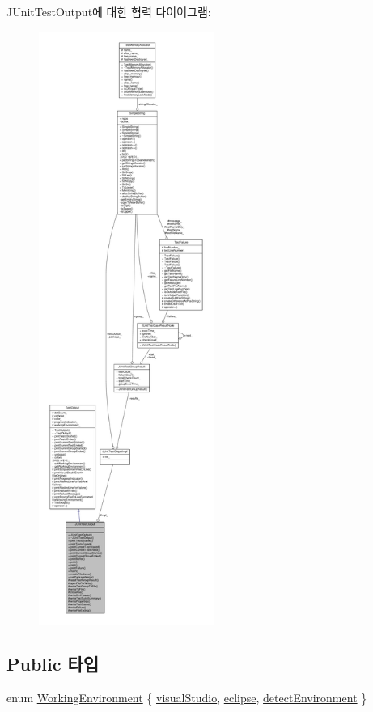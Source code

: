 J\+Unit\+Test\+Output에 대한 협력 다이어그램\+:
\nopagebreak
\begin{figure}[H]
\begin{center}
\leavevmode
\includegraphics[height=550pt]{class_j_unit_test_output__coll__graph}
\end{center}
\end{figure}
\subsection*{Public 타입}
\begin{DoxyCompactItemize}
\item 
enum \hyperlink{class_test_output_a0541851f863713454486a9fb3080f766}{Working\+Environment} \{ \hyperlink{class_test_output_a0541851f863713454486a9fb3080f766a47f3a5b9ed4237588024b983a4ca8399}{visual\+Studio}, 
\hyperlink{class_test_output_a0541851f863713454486a9fb3080f766abf6505364f680c2682d5648cd0c76f53}{eclipse}, 
\hyperlink{class_test_output_a0541851f863713454486a9fb3080f766a3f11f791db94db142e33c3c75442ed10}{detect\+Environment}
 \}
\end{DoxyCompactItemize}
